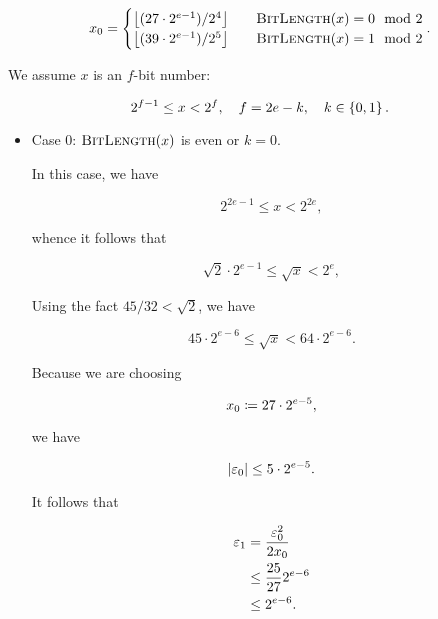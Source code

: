 \begin{equation}
    x_{0} = \begin{cases}
        \left\lfloor (27\cdot2^{e-1})/2^{4} \right\rfloor &\quad
            \textsc{BitLength}(x) = 0 \mod 2 \\
        \left\lfloor (39\cdot2^{e-1})/2^{5} \right\rfloor &\quad
            \textsc{BitLength}(x) = 1 \mod 2 \\
    \end{cases}.
\end{equation}

\noindent
We assume $x$ is an $f$-bit number:

\begin{equation}
    2^{f-1} \le x < 2^{f}, \quad f = 2e-k, \quad k\in\left\{ 0,1 \right\}.
\end{equation}

\begin{itemize}
\item Case 0: $\textsc{BitLength}(x)$ is even or $k=0$.

In this case, we have

\begin{equation}
    2^{2e-1} \le x < 2^{2e},
\end{equation}

\noindent
whence it follows that

\begin{equation}
    \sqrt{2}\cdot2^{e-1} \le \sqrt{x} < 2^{e},
\end{equation}

\noindent
Using the fact $45/32 < \sqrt{2}$, we have

\begin{equation}
    45\cdot2^{e-6} \le \sqrt{x} < 64\cdot2^{e-6}.
\end{equation}

\noindent
Because we are choosing

\begin{equation}
    x_{0} \coloneqq{} 27\cdot2^{e-5},
\end{equation}

\noindent
we have

\begin{equation}
    \left| \varepsilon_{0} \right| \le 5\cdot2^{e-5}.
\end{equation}

It follows that

\begin{align}
    \varepsilon_{1} &= \frac{\varepsilon_{0}^{2}}{2x_{0}} \nonumber\\
        &\le \frac{25}{27}2^{e-6} \nonumber\\
        &\le 2^{e-6}.
\end{align}


\end{itemize}
